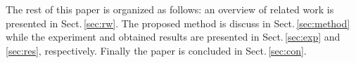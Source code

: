 The rest of this paper is organized as follows: an overview of related work is presented in Sect.\,\ref{sec:rw}.
The proposed method is discuss in Sect.\,\ref{sec:method} while the experiment and obtained results are presented in Sect.\,\ref{sec:exp} and\,\ref{sec:res}, respectively.
Finally the paper is concluded in Sect.\,\ref{sec:con}.




